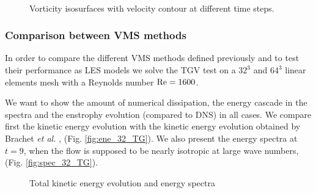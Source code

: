 \begin{figure}[p]
  \\
  \caption{Vorticity isosurfaces with velocity contour at different time steps.}
  \label{fig:isovor_vel_TG}
\end{figure}

\subsubsection{Comparison between VMS methods}

In order to compare the different VMS methods defined previously and to test their performance as LES models
we solve the TGV test on a $32^3$ and $64^3$ linear elements mesh with a Reynolds number ${\rm Re}=1600$. 

We want to show the amount of numerical dissipation, the energy cascade in the spectra and the enstrophy evolution (compared to DNS) in all cases. We compare first the kinetic energy evolution  with the kinetic energy evolution obtained by Brachet \emph{et al.} \cite{brachet_small-scale_1983}, (Fig. \ref{fig:ene_32_TG}). We also present the energy spectra at $t=9$, when the flow is supposed to be nearly isotropic at large wave numbers, (Fig. \ref{fig:spec_32_TG}).
\begin{figure}[h!]
 	\centering	
 	\caption{Total kinetic energy evolution and energy spectra}
 	\label{fig:ene_spec_32_TG}
 \end{figure}

